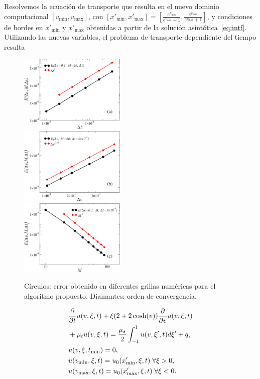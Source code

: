Resolvemos la ecuación de transporte que resulta en el nuevo dominio computacional
$[v_{\text{min}},v_{\text{max}}]$, con 
$[x'_{\text{min}},x'_{\text{max}}]=[\frac{e^{v_{\text{min}}}}{e^{v_{\text{min}}}+1},
\frac{e^{v_{\text{max}}}}{e^{v_{\text{max}}}+1}]$, 
y condiciones de bordes en $x'_{\text{min}}$ y $x'_{\text{max}}$ 
obtenidas a partir de la solución asintótica~\eqref{eq:intf}. Utilizando las nuevas variables, 
el problema de transporte dependiente del tiempo resulta 
\begin{figure}
  \includegraphics[width=0.45\textwidth]{figuras/errdt.pdf}\\
  \vspace{2mm}
  \includegraphics[width=0.45\textwidth]{figuras/errdx.pdf}\\
  \vspace{2mm}
  \includegraphics[width=0.45\textwidth]{figuras/xiconv.pdf}
  \caption{Círculos: error obtenido en diferentes grillas numéricas para el algoritmo 
  propuesto. Diamantes: orden de convergencia.}
 \label{fig:conv}
\end{figure}
\begin{equation}
\begin{split}
&\frac{\partial}{\partial t}u(v,\xi,t)+\xi(2+2\cosh(v)) \frac{\partial}{\partial v}u(v,\xi,t)\\
&+\mu_tu(v,\xi,t)=\frac{\mu_s}{2} \int_{-1}^{1} u(v,\xi',t) d\xi'+q, \\
&u(v,\xi,t_{\text{min}})=0,\\
&u(v_{\text{min}},\xi,t)=u_{0}(x'_{\text{min}},\xi,t) \; \forall \xi>0,\\
&u(v_{\text{max}},\xi,t)=u_{0}(x'_{\text{max}},\xi,t) \; \forall \xi<0.
\end{split}
\label{eq:transptd}
\end{equation}
